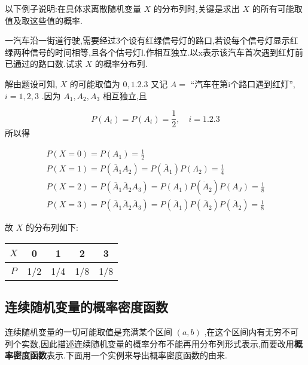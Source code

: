 以下例子说明:在具体求离散随机变量 $ X $ 的分布列时,关键是求出 $ X $ 的所有可能取值及取这些值的概率.

\begin{example}\label{exam:2.1.5}
	一汽车沿一街道行驶,需要经过3个设有红绿信号灯的路口,若设每个信号灯显示红绿两种信号的时间相等,且各个估号灯l.作相互独立.以x表示该汽车首次遇到红灯前已通过的路口数.试求 $ X $ 的概率分布列.
	
	解由题设可知, $ X $ 的可能取值为 $ 0,1.2.3 $ 又记 $ A= $ “汽车在第i个路口遇到红灯”, $ i=1,2,3 $ .因为 $ A_1,A_2,A_3 $ 相互独立,且
	
	\[ 
	P\left(A_{t}\right)=P\left(A_{t}\right)=\frac{1}{2}, \quad i=1.2 .3
	\]
	所以得
	
	\[ 
	\begin{array}{l}
	{P(X=0)=P\left(A_{1}\right)=\frac{1}{2}} \\ 
	{P(X=1)=P\left(\overline{A}_{1} A_{2}\right)=P\left(\overline{A}_{1}\right) P\left(\Lambda_{2}\right)=\frac{1}{4}} \\ 
	{P(X=2)=P\left(\overline{A}_{1} \overline{A}_{2} A_{3}\right)=P\left(A_{1}\right) P\left(\dot{A}_{2}\right) P\left(A_{J}\right)=\frac{1}{8}}\\
	{P(X=3)=P\left(\overline{A}_{1} \overline{A}_{2} \overline{A}_{3}\right)=P\left(\overline{A}_{1}\right) P\left(\overline{A}_{2}\right) P\left(\overline{A}_{2}\right)=\frac{1}{8}}
	\end{array}
	\]
	
	故 $ X $ 的分布列如下:
	
	\begin{table}[htbp]
		\centering
		\begin{tabular}{c|cccc}
			 $ X $ & 0     & 1     & 2     & 3 \\\midrule
			 $ P $ & 1/2   & 1/4   & 1/8   & 1/8 \\
		\end{tabular}%
	\end{table}%
	
\end{example}

\subsection{连续随机变量的概率密度函数}\label{ssec:2.1.4}

连续随机变量的一切可能取值是充满某个区间 $ (a,b) $ ,在这个区间内有无穷不可列个实数,因此描述连续随机变量的概率分布不能再用分布列形式表示,而要改用\textbf{概率密度函数}表示.下面用一个实例来导出概率密度函数的由来.

